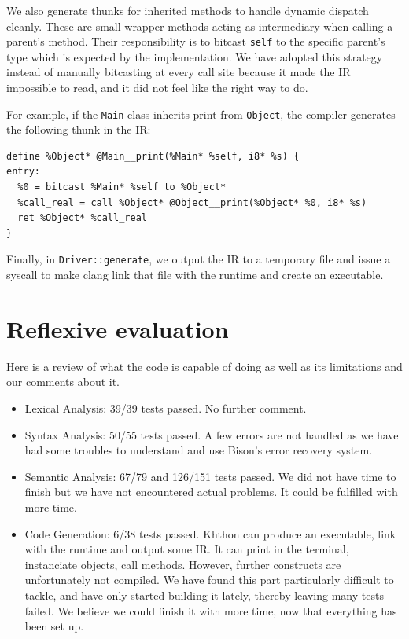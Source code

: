 \documentclass{article}
\begin{document}
We also generate thunks for inherited methods to handle dynamic dispatch cleanly. These are small wrapper methods acting as intermediary when calling a parent's method. Their responsibility is to bitcast \texttt{self} to the specific parent's type which is expected by the implementation.
We have adopted this strategy instead of manually bitcasting at every call site because it made the IR impossible to read, and it did not feel like the right way to do. 

For example, if the \texttt{Main} class inherits print from \texttt{Object}, the compiler generates the following thunk in the IR:

\begin{verbatim}
define %Object* @Main__print(%Main* %self, i8* %s) {
entry:
  %0 = bitcast %Main* %self to %Object*
  %call_real = call %Object* @Object__print(%Object* %0, i8* %s)
  ret %Object* %call_real
}
\end{verbatim}

Finally, in \texttt{Driver::generate}, we output the IR to a temporary file and issue a syscall to make clang link that file with the runtime and create an executable.

\section{Reflexive evaluation}

Here is a review of what the code is capable of doing as well as its limitations and our comments about it.

\begin{itemize}
    \item Lexical Analysis: 39/39 tests passed. No further comment.
    \item Syntax Analysis: 50/55 tests passed. A few errors are not handled as we have had some troubles to understand and use Bison's error recovery system.
    \item Semantic Analysis: 67/79 and 126/151 tests passed. We did not have time to finish but we have not encountered actual problems. It could be fulfilled with more time.
    \item Code Generation: 6/38 tests passed. Khthon can produce an executable, link with the runtime and output some IR. It can print in the terminal, instanciate objects, call methods. However, further constructs are unfortunately not compiled. We have found this part particularly difficult to tackle, and have only started building it lately, thereby leaving many tests failed. We believe we could finish it with more time, now that everything has been set up. 
\end{itemize}
\end{document}
